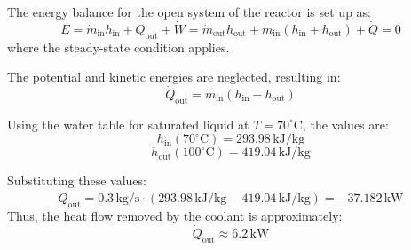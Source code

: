 The energy balance for the open system of the reactor is set up as:  
\[
E = \dot{m}_{\text{in}} h_{\text{in}} + \dot{Q}_{\text{out}} + \dot{W} = \dot{m}_{\text{out}} h_{\text{out}} + \dot{m}_{\text{in}} \left( h_{\text{in}} + h_{\text{out}} \right) + \dot{Q} = 0
\]  
where the steady-state condition applies.  

The potential and kinetic energies are neglected, resulting in:  
\[
\dot{Q}_{\text{out}} = \dot{m}_{\text{in}} \left( h_{\text{in}} - h_{\text{out}} \right)
\]  

Using the water table for saturated liquid at \( T = 70^\circ\text{C} \), the values are:  
\[
h_{\text{in}}(70^\circ\text{C}) = 293.98 \, \text{kJ/kg}
\]  
\[
h_{\text{out}}(100^\circ\text{C}) = 419.04 \, \text{kJ/kg}
\]  

Substituting these values:  
\[
\dot{Q}_{\text{out}} = 0.3 \, \text{kg/s} \cdot (293.98 \, \text{kJ/kg} - 419.04 \, \text{kJ/kg}) = -37.182 \, \text{kW}
\]  
Thus, the heat flow removed by the coolant is approximately:  
\[
\dot{Q}_{\text{out}} \approx 6.2 \, \text{kW}
\]
